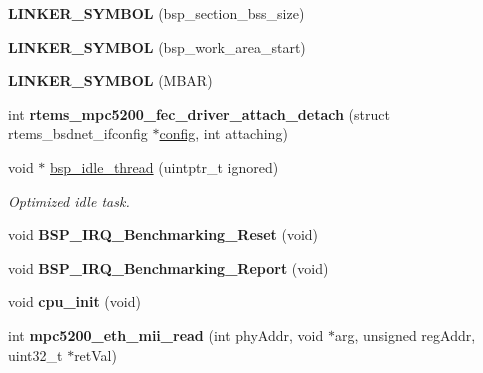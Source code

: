 \begin{DoxyCompactItemize}
{\bfseries L\+I\+N\+K\+E\+R\+\_\+\+S\+Y\+M\+B\+OL} (bsp\+\_\+section\+\_\+bss\+\_\+size)
\item 
\mbox{\label{group__RTEMSBSPsPowerPCGen5200_ga4996e27f277924c49b95516b59bbc86e}} 
{\bfseries L\+I\+N\+K\+E\+R\+\_\+\+S\+Y\+M\+B\+OL} (bsp\+\_\+work\+\_\+area\+\_\+start)
\item 
\mbox{\label{group__RTEMSBSPsPowerPCGen5200_ga75a1c59340e53df9b828592cafcd3077}} 
{\bfseries L\+I\+N\+K\+E\+R\+\_\+\+S\+Y\+M\+B\+OL} (M\+B\+AR)
\item 
\mbox{\label{group__RTEMSBSPsPowerPCGen5200_gada9d1c40473a93e1ff1f906d44c22a3e}} 
int {\bfseries rtems\+\_\+mpc5200\+\_\+fec\+\_\+driver\+\_\+attach\+\_\+detach} (struct rtems\+\_\+bsdnet\+\_\+ifconfig $\ast$\mbox{\hyperlink{structconfig__s}{config}}, int attaching)
\item 
void $\ast$ \mbox{\hyperlink{group__RTEMSBSPsPowerPCGen5200_ga301be7085b80c41a9c5887247003c662}{bsp\+\_\+idle\+\_\+thread}} (uintptr\+\_\+t ignored)
\begin{DoxyCompactList}\small\item\em Optimized idle task. \end{DoxyCompactList}\item 
\mbox{\label{group__RTEMSBSPsPowerPCGen5200_gabeb75ce9f8724f13cd4c0df3bd38aaa7}} 
void {\bfseries B\+S\+P\+\_\+\+I\+R\+Q\+\_\+\+Benchmarking\+\_\+\+Reset} (void)
\item 
\mbox{\label{group__RTEMSBSPsPowerPCGen5200_gabffe64cf92941307f2a05019dd6eb5f4}} 
void {\bfseries B\+S\+P\+\_\+\+I\+R\+Q\+\_\+\+Benchmarking\+\_\+\+Report} (void)
\item 
\mbox{\label{group__RTEMSBSPsPowerPCGen5200_ga560ad8614ae03841a10b489f4370bc51}} 
void {\bfseries cpu\+\_\+init} (void)
\item 
\mbox{\label{group__RTEMSBSPsPowerPCGen5200_ga7017009ba7f396f0c0726b885c7d3a1c}} 
int {\bfseries mpc5200\+\_\+eth\+\_\+mii\+\_\+read} (int phy\+Addr, void $\ast$arg, unsigned reg\+Addr, uint32\+\_\+t $\ast$ret\+Val)
\end{DoxyCompactItemize}


